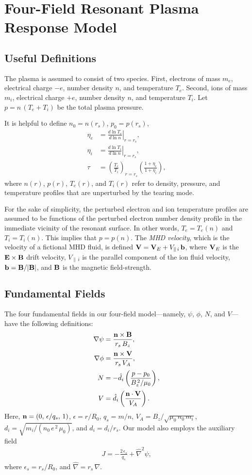 \documentclass[12pt,prb,aps]{revtex4-1}
\begin{document}
\section{Four-Field Resonant Plasma Response Model}\label{sfour}
\subsection{Useful Definitions}
The plasma is assumed to consist of two species. First, electrons of mass $m_e$, electrical charge $-e$, 
number density $n$, and temperature $T_e$.  Second, ions of mass $m_i$, electrical charge $+e$,  
number density $n$, and temperature $T_i$. Let $p=n\,(T_e+T_i)$ be the total plasma pressure. 

It is helpful to define $n_0 = n(r_s)$, $p_0= p(r_s)$,
\begin{align}
\eta_e &=\left.\frac{d\ln T_e}{d\ln n}\right|_{r=r_s},\label{e211}\\[0.5ex]
\eta_i &= \left.\frac{d\ln T_i}{d\ln n}\right|_{r=r_s},\\[0.5ex]
\tau &= \left(\frac{T_e}{T_i}\right)_{r=r_s}\left(\frac{1+\eta_e}{1+\eta_i}\right),\label{e213}
\end{align}
where $n(r)$, $p(r)$, $T_e(r)$, and $T_i(r)$ refer to
density, pressure, and temperature profiles that are unperturbed by the tearing mode. 

For the sake of simplicity, the perturbed electron and ion temperature profiles are assumed to be functions of
the perturbed electron number density profile in the immediate vicinity of the resonant surface. In other words, $T_e=T_e(n)$ and $T_i=T_i(n)$. This
implies that $p=p(n)$. 
The {\em MHD velocity}, which is the velocity of a
fictional MHD fluid, is defined ${\bf V}={\bf V}_E + V_{\parallel\,i}\,{\bf b}$, where ${\bf V}_E$ is the
${\bf E}\times{\bf B}$ drift velocity, $V_{\parallel\,i}$ is the parallel component of the ion fluid
velocity, ${\bf b}= {\bf B}/|{\bf B}|$, and ${\bf B}$ is the magnetic field-strength.

\subsection{Fundamental Fields}
The four fundamental fields in our four-field model---namely, $\psi$, $\phi$, $N$, and $V$---have the following
definitions:
\begin{align}\label{e10}
\nabla\psi &= \frac{{\bf n}\times{\bf B}}{r_s\,B_z},\\[0.5ex]
\nabla\phi &= \frac{{\bf n}\times {\bf V}}{r_s\,V_A},\\[0.5ex]
N &=-\hat{d}_i\left(\frac{p-p_0}{B_z^{\,2}/\mu_0}\right),\\[0.5ex]
V &= \hat{d}_i\left(\frac{{\bf n}\cdot {\bf V}}{V_A}\right).\label{e13}
\end{align}
Here,   ${\bf n} = (0,\,\epsilon/q_s,\,1)$, $\epsilon = r/R_0$, $q_s=m/n$, 
$V_A =B_z/\sqrt{\mu_0\,n_0\,m_i}$, 
$d_i = \sqrt{m_i/(n_0\,e^{\,2}\,\mu_0)}$,
and $\hat{d}_i=d_i/r_s$. 
 Our
model also employs the auxiliary field
\begin{align}\label{e16}
J=-\frac{2\,\epsilon_s}{q_s}+\hat{\nabla}^2\psi,
\end{align}
where 
$\epsilon_s=r_s/R_0$, and $\hat{\nabla} = r_s\,\nabla$. 
\end{document}
